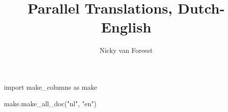 \documentclass[a4paper]{article}
\author{Nicky van Foreest}
\title{Parallel Translations, Dutch-English}
\begin{document}
\maketitle
\RaggedRight

\tableofcontents

\begin{pycode}
import make_columns as make

make.make_all_doc("nl", "en")
\end{pycode}
\end{document}
